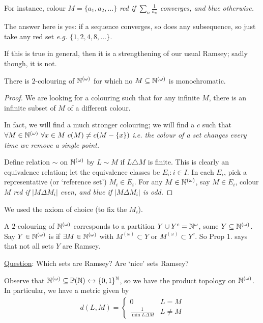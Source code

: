 \documentclass[10pt]{article}
\newcommand{\om}{\omega}
\newcommand{\bom}{{(\omega)}}
\begin{document}
For instance, colour $M = \{a_1,a_2,\dots\}$ \it{red} if $\sum_n \frac{1}{a_n}$ converges, and blue otherwise.

The answer here is yes: if a sequence converges, so does any subsequence, so just take any red set \it{e.g.} $\{1,2,4,8,\dots\}$.

If this is true in general, then it is a strengthening of our usual Ramsey; sadly though, it is not.

\begin{prop}
    There is  $2$-colouring of $\N^\bom$ for which no $M\subset \N^\bom$ is monochromatic.
\end{prop}
\begin{proof}
    We are looking for a colouring such that for any infinite $M$, there is an infinite subset of $M$ of a different colour.

    In fact, we will find a much stronger colouring; we will find a $c$ such that $\forall M \in \N^\bom\ \forall x \in M\ c(M)\ne c(M-\{x\})$ \it{i.e.} the colour of a set changes every time we remove a single point.

    Define relation $\sim$ on $\N^\bom$ by $L\sim M$ if $L\triangle M$ is finite. This is clearly an equivalence relation; let the equivalence classes be $E_i:i\in I$. In each $E_i$, pick a representative (or `reference set') $M_i \in E_i$. For any $M \in \N^\bom$, say $M\in E_i$, colour $M$ \it{red} if $|M\Delta M_i|$ even, and \it{blue} if $|M\Delta M_i|$ is odd.
\end{proof}
\begin{remark*}
    We used the axiom of choice (to fix the $M_i$).
\end{remark*}

A $2$-colouring of $\N^\bom$ corresponds to a partition $Y\cup Y^c = \N^\om$, some $Y\subset \N^\bom$. Say $Y \in \N^\bom$ is  if $\exists M \in \N^\bom$ with $M^\bom\subset Y$ or $M^\bom\subset Y^c$. So Prop 1. says that not all sets $Y$ are Ramsey.

\underline{Question}: Which sets are Ramsey? Are `nice' sets Ramsey?

Observe that $\N^\bom \subset \P(\N) \xleftrightarrow{} \{0,1\}^\N$, so we have the product topology on $\N^\bom$. In particular, we have a metric given by
\begin{align*}
    d(L,M) = \left\lbrace \begin{array}{cl} 0 & L=M \\ \frac{1}{\min L\Delta M} & L\ne M \end{array}\right.
\end{align*}
\end{document}
